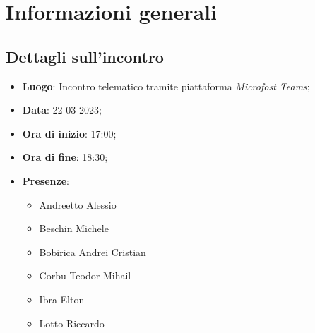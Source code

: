 \section{Informazioni generali}

\subsection{Dettagli sull'incontro}
\begin{itemize}
\item \textbf{Luogo}: Incontro telematico tramite piattaforma \textit{Microfost Teams\glo};
\item \textbf{Data}: 22-03-2023;
\item \textbf{Ora di inizio}: 17:00;
\item \textbf{Ora di fine}: 18:30;
\item \textbf{Presenze}: 
\begin{itemize}
	\item Andreetto Alessio
    \item Beschin Michele
    \item Bobirica Andrei Cristian
    \item Corbu Teodor Mihail
    \item Ibra Elton
    \item Lotto Riccardo
\end{itemize}
\end{itemize}



